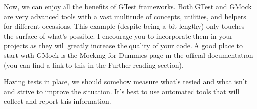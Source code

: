 Now, we can enjoy all the benefits of GTest frameworks. Both GTest and GMock are very advanced tools with a vast multitude of concepts, utilities, and helpers for different occasions. This example (despite being a bit lengthy) only touches the surface of what's possible. I encourage you to incorporate them in your projects as they will greatly increase the quality of your code. A good place to start with GMock is the Mocking for Dummies page in the official documentation (you can find a link to this in the Further reading section).

Having tests in place, we should somehow measure what's tested and what isn't and strive to improve the situation. It's best to use automated tools that will collect and report this information.

